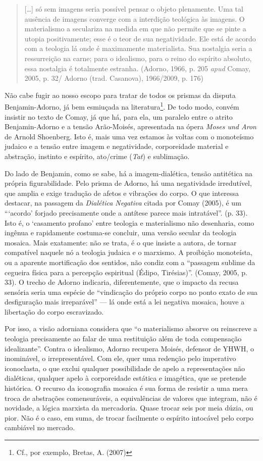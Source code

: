 \begin{quote}
{[}\ldots{}{]} só sem imagens seria possível pensar o objeto plenamente. Uma
tal ausência de imagens converge com a interdição teológica às imagens.
O materialismo a seculariza na medida em que não permite que se pinte a
utopia positivamente; esse é o teor de sua negatividade. Ele está de
acordo com a teologia lá onde é maximamente materialista. Sua nostalgia
seria a ressurreição na carne; para o idealismo, para o reino do
espírito absoluto, essa nostalgia é totalmente estranha. (Adorno, 1966,
p. 205 \emph{apud} Comay, 2005, p. 32/ Adorno (trad. Casanova),
1966/2009, p. 176)
\end{quote}

Não cabe fugir ao nosso escopo para tratar de todos os prismas da
disputa Benjamin-Adorno, já bem esmiuçada na literatura\footnote{Cf.,
  por exemplo, Bretas, A. (2007)}. De todo modo, convém insistir no
texto de Comay, já que há, para ela, um paralelo entre o atrito
Benjamin-Adorno e a tensão Arão-Moisés, apresentada na ópera \emph{Moses
und Aron} de Arnold Shoenberg. Isto é, mais uma vez estamos às voltas
com o monoteísmo judaico e a tensão entre imagem e negatividade,
corporeidade material e abstração, instinto e espírito, ato/crime
(\emph{Tat}) e sublimação.

Do lado de Benjamin, como se sabe, há a imagem-dialética, tensão
antitética na própria figurabilidade. Pelo prisma de Adorno, há uma
negatividade irredutível, que amplia e exige tradução de afetos e
vibrações do corpo. O que interessa destacar, na passagem da
\emph{Dialética Negativa} citada por Comay (2005), é um ```acordo'
forjado precisamente onde a antítese parece mais intratável''. (p. 33).
Isto é, o `casamento profano' entre teologia e materialismo não
desenharia, como ingênua e rapidamente costuma-se concluir, uma versão
secular da teologia mosaica. Mais exatamente: não se trata, é o que
insiste a autora, de tornar compatível naquele nó a teologia judaica e o
marxismo. A proibição monoteísta, ou a aparente mortificação dos
sentidos, não condiz com a ``passagem sublime da cegueira física para a
percepção espiritual (Édipo, Tirésias)''. (Comay, 2005, p. 33). O trecho
de Adorno indicaria, diferentemente, que o impacto da recusa sensória
seria uma espécie de ``vindicação do próprio corpo no ponto exato de sua
desfiguração mais irreparável'' --- lá onde está a lei negativa mosaica,
houve a libertação do corpo escravizado.

Por isso, a visão adorniana considera que ``o materialismo absorve ou
reinscreve a teologia precisamente ao falar de uma restituição além de
toda compensação idealizante''. Contra o idealismo, Adorno recupera
Moisés, defensor de YHWH, o inominável, o irrepresentável. Com ele, quer
uma redenção pelo imperativo iconoclasta, o que exclui qualquer
possibilidade de apelo a representações não dialéticas, qualquer apelo à
corporeidade estática e imagética, que se pretende histórica. O recurso
da iconografia mosaica é sua forma de resistir a uma mera troca de
abstrações comensuráveis, a equivalências de valores que integram, não é
novidade, a lógica marxista da mercadoria. Quase trocar seis por meia
dúzia, ou pior. Não é o caso, em suma, de trocar facilmente o espírito
intocável pelo corpo cambiável no mercado.

